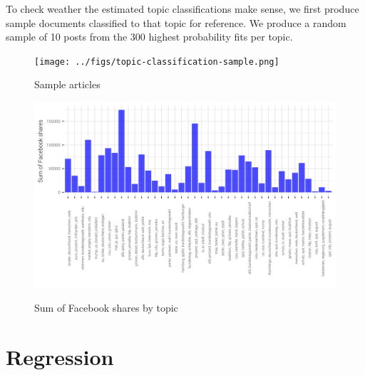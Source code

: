 \documentclass[12pt,a4paper,notitlepage]{article}
\begin{document}
To check weather the estimated topic classifications make sense, we first produce sample documents classified to that topic for reference. We produce a random sample of 10 posts from the 300 highest probability fits per topic.

\begin{figure}[H]
\centering
	\caption{Sample articles}
	\texttt{[image: ../figs/topic-classification-sample.png]}	
	\label{fig_classification}
\end{figure}

\begin{figure}[H]
\centering
	\caption{Sum of Facebook shares by topic}
	\includegraphics[width=\textwidth]{../figs/fb_shares_topics.png}	
	\label{fig_fb_shares_topic}
\end{figure}

\section{Regression}\label{ch_regression}
\end{document}

